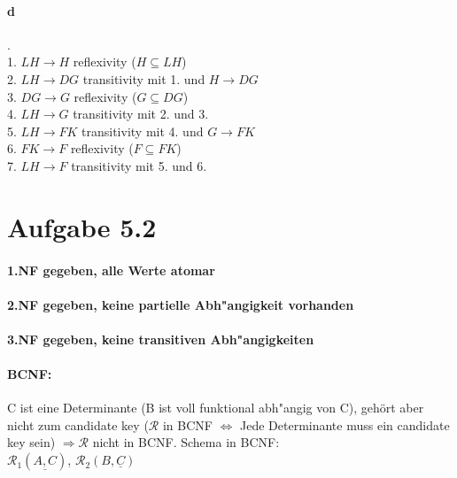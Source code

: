 \documentclass{article}
\begin{document}
	
		\paragraph*{d}.\\
		1. $ LH \rightarrow H $ \hspace*{40mm}reflexivity ($ H \subseteq LH $)\\
		2. $ LH \rightarrow DG $ \hspace*{37mm}transitivity mit 1. und $ H \rightarrow DG $\\
		3. $ DG \rightarrow G $ \hspace*{40mm}reflexivity ($ G \subseteq DG $)\\
		4. $ LH \rightarrow G $ \hspace*{40mm}transitivity mit 2. und 3.\\
		5. $ LH \rightarrow FK $ \hspace*{37mm}transitivity mit 4. und $ G \rightarrow FK $\\
		6. $ FK \rightarrow F $ \hspace*{40mm}reflexivity ($ F \subseteq FK $)\\
		7. $ LH \rightarrow F $ \hspace*{40mm}transitivity mit 5. und 6.\\
	
	
	\section*{Aufgabe 5.2}
	\paragraph*{1.NF gegeben, alle Werte atomar}
	\paragraph*{2.NF gegeben, keine partielle Abh"angigkeit vorhanden}
	\paragraph*{3.NF gegeben, keine transitiven Abh"angigkeiten}
	\paragraph*{BCNF:}
	C ist eine Determinante (B ist voll funktional abh"angig von C), gehört aber nicht zum candidate key ($ \mathcal{R} $ in BCNF $ \Leftrightarrow $ Jede Determinante muss ein candidate key sein) $ \Rightarrow \mathcal{R} $ nicht in BCNF. Schema in BCNF:\\
	$ \mathcal{R}_1(\underline{A,C}) $, $ \mathcal{R}_2(B,\underline{C}) $
	
\end{document}
